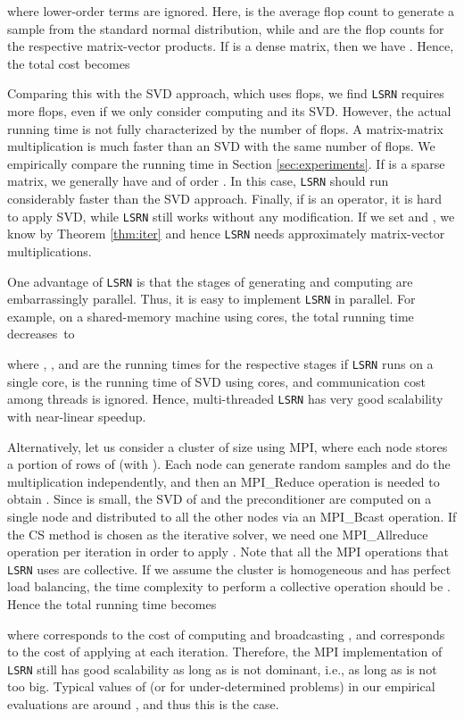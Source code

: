 \documentclass{siamltex}
\begin{document}
where lower-order terms are ignored. 
Here,  is the average flop count to generate a 
sample from the standard normal distribution, while  and 
 are the flop counts for the respective matrix-vector 
products. 
If  is a dense matrix, then we have 
. 
Hence, the total cost becomes

Comparing this with the SVD approach, which uses  flops, we
find \texttt{LSRN} requires more flops, even if we only consider computing
 and its SVD.  However, the actual running time is not fully
characterized by the number of flops.  A matrix-matrix multiplication is much
faster than an SVD with the same number of flops.  We empirically compare the
running time in Section \ref{sec:experiments}.  If  is a sparse matrix, we
generally have  and  of order
. In this case, \texttt{LSRN} should run considerably faster
than the SVD approach. Finally, if  is an operator, it is hard to apply SVD,
while \texttt{LSRN} still works without any modification. If we set 
and , we know  by Theorem
\ref{thm:iter} and hence \texttt{LSRN} needs approximately 
matrix-vector multiplications.

One advantage of \texttt{LSRN} is that the stages of generating  and 
computing  are embarrassingly parallel. 
Thus, it is easy to implement \texttt{LSRN} in parallel. 
For example, on a shared-memory machine using  cores, the total running
time decreases~to

where , , and  are the 
running times for the respective stages if \texttt{LSRN} runs on a single 
core,  is the running time of SVD using  
cores, and communication cost among threads is ignored. 
Hence, multi-threaded \texttt{LSRN} has very good scalability with 
near-linear speedup. 

Alternatively, let us consider a cluster of size  using MPI, where each node
stores a portion of rows of  (with ). Each node can generate random
samples and do the multiplication independently, and then an MPI\_Reduce
operation is needed to obtain . Since  is small, the SVD of
 and the preconditioner  are computed on a single node and
distributed to all the other nodes via an MPI\_Bcast operation. If the CS method
is chosen as the iterative solver, we need one MPI\_Allreduce operation per
iteration in order to apply . Note that all the MPI operations that
\texttt{LSRN} uses are collective. If we assume the cluster is homogeneous and
has perfect load balancing, the time complexity to perform a collective
operation should be . Hence the total running time becomes

where  corresponds to the cost of computing  and broadcasting
, and  corresponds to the cost of applying  at each
iteration. Therefore, the MPI implementation of \texttt{LSRN} still has good
scalability as long as  is not dominant, i.e., as long as
 is not too big.  Typical values of  (or  for under-determined
problems) in our empirical evaluations are around , and thus this is the
case.
\end{document}
